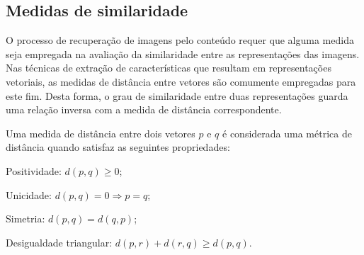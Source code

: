 \begin{comment}
As abordagens empregadas na obtenção de representações a partir das formas podem ser classificadas em 3 grandes categorias:

\begin{alineas}

\item representação por vetor de características: É a técnica mais popular de representação. Neste método, a forma é representada através de um vetor numérico e a similaridade entre as formas é avaliada através de uma distância entre vetores. 

\item representação por transformação: deformações são realizadas em uma forma a fim de transformá-la em outra. A similaridade entre as formas é medida pelo esforço necessário para se realizar a transformação.  

\item representação relacional: Nesta abordagem as formas são divididas em um conjunto de partes constituintes. Cada parte é individualmente representada através de vetores de características. O descritor é composto a partir destes vetores e da relação existente entre as partes.
\end{alineas}

Técnicas de representação por vetores de características são classificadas em duas grandes classes: técnicas baseadas em região e técnicas baseadas em contorno.
\end{comment}

\subsection{Medidas de similaridade}
O processo de recuperação de imagens pelo conteúdo requer que alguma medida seja empregada na avaliação da similaridade entre as representações das imagens. Nas técnicas de extração de características que resultam em representações vetoriais, as medidas de distância entre vetores são comumente empregadas para este fim. Desta forma, o grau de similaridade entre duas representações guarda uma relação inversa com a medida de distância correspondente. 

Uma medida de distância entre dois vetores $p$ e $q$ é considerada uma métrica de distância quando satisfaz as seguintes propriedades: 

\begin{alineas}
\item Positividade: $d(p,q) \geq 0$;  
\item Unicidade: $d(p,q) = 0 \Rightarrow p = q$;
\item Simetria: $d(p,q) = d(q,p)$;
\item Desigualdade triangular: $d(p,r) + d(r,q) \geq d(p,q)$.
\end{alineas}

